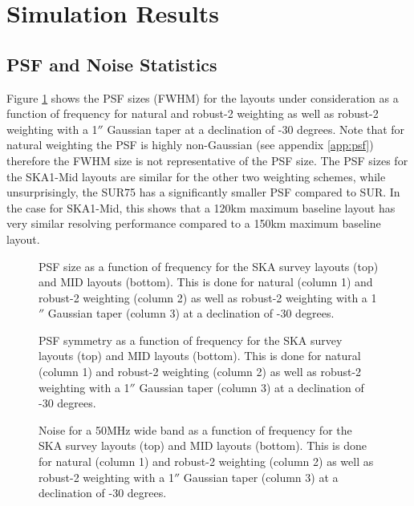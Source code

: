 \documentclass[sfheadings,a4paper,times,9pt,floats,floatfix]{article}
\begin{document}
\section{Simulation Results}\label{sec:results}
\subsection{PSF and Noise Statistics}
Figure \ref{fig:full-psf_meam} shows the PSF sizes (FWHM) for the layouts under consideration as a function of frequency
for natural and robust-2 weighting as well as robust-2 weighting  with a 1$''$ Gaussian taper at a declination of -30
degrees. Note that for natural weighting the PSF is highly non-Gaussian (see appendix \ref{app:psf}) therefore the FWHM
size is not representative of the PSF size. The PSF sizes for the SKA1-Mid layouts are similar for the other two
weighting schemes, while unsurprisingly, the SUR75 has a significantly smaller PSF compared to SUR. In the case for
SKA1-Mid, this shows that a 120km maximum baseline layout has very similar resolving performance compared to a 150km
maximum baseline layout. 

\begin{figure}[H]
%  
 
%  
 \caption{PSF size as a function of frequency for the SKA survey layouts (top) and MID layouts (bottom).
This is done for natural (column 1) and robust-2 weighting (column 2) as well as robust-2 weighting  with a 1$''$
Gaussian taper (column 3) at a declination of -30 degrees.}\label{fig:full-psf_meam}
\end{figure}

\begin{figure}[H]
%  
 
%  
 \caption{PSF symmetry as a function of frequency for the SKA survey layouts (top) and MID layouts (bottom).
This is done for natural (column 1) and robust-2 weighting (column 2) as well as robust-2 weighting  with a 1$''$
Gaussian taper (column 3) at a declination of -30 degrees.}\label{fig:full-psf_sym}
\end{figure}

\begin{figure}[H]
%  
 
%  
 \caption{Noise for a 50MHz wide band as a function of frequency for the SKA survey layouts (top) and MID layouts
(bottom).
This is done for natural (column 1) and robust-2 weighting (column 2) as well as robust-2 weighting  with a 1$''$
Gaussian taper (column 3) at a declination of -30 degrees.}\label{fig:full-noise50}
\end{figure}
\end{document}
